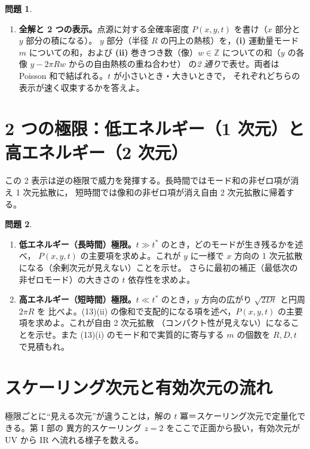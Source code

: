 \documentclass[dvipdfmx, uplatex]{jsarticle}
\theoremstyle{definition}
\newtheorem*{prob}{問題}
\begin{document}
\begin{prob}
\begin{enumerate}[start=13]
\item \textbf{全解と 2 つの表示。}点源に対する全確率密度 $P(x,y,t)$ を書け（$x$ 部分と $y$ 部分の積になる）。
$y$ 部分（半径 $R$ の円上の熱核）を，\textbf{(i)} 運動量モード $m$ についての和，および
\textbf{(ii)} 巻きつき数（像）$w\in\mathbb{Z}$ についての和（$y$ の各像 $y-2\pi Rw$ からの自由熱核の重ね合わせ）
の\emph{2 通り}で表せ。両者は Poisson 和で結ばれる。$t$ が小さいとき・大きいときで，
それぞれどちらの表示が速く収束するかを答えよ。
\end{enumerate}
\end{prob}

\section{2 つの極限：低エネルギー（1 次元）と高エネルギー（2 次元）}
この 2 表示は逆の極限で威力を発揮する。長時間ではモード和の非ゼロ項が消え 1 次元拡散に，
短時間では像和の非ゼロ項が消え自由 2 次元拡散に帰着する。

\begin{prob}
\begin{enumerate}[start=14]
\item \textbf{低エネルギー（長時間）極限。}$t\gg t^\ast$ のとき，どのモードが生き残るかを述べ，
$P(x,y,t)$ の主要項を求めよ。これが $y$ に一様で $x$ 方向の 1 次元拡散になる（余剰次元が見えない）ことを示せ。
さらに最初の補正（最低次の非ゼロモード）の大きさの $t$ 依存性を求めよ。
\item \textbf{高エネルギー（短時間）極限。}$t\ll t^\ast$ のとき，$y$ 方向の広がり $\sqrt{2Dt}$ と円周 $2\pi R$ を
比べよ。(13)(ii) の像和で支配的になる項を述べ，$P(x,y,t)$ の主要項を求めよ。これが自由 2 次元拡散
（コンパクト性が見えない）になることを示せ。また (13)(i) のモード和で実質的に寄与する $m$ の個数を
$R,D,t$ で見積もれ。
\end{enumerate}
\end{prob}

\section{スケーリング次元と有効次元の流れ}
極限ごとに``見える次元''が違うことは，解の $t$ 冪＝スケーリング次元で定量化できる。第 I 部の
異方的スケーリング $z=2$ をここで正面から扱い，有効次元が UV から IR へ流れる様子を数える。
\end{document}
